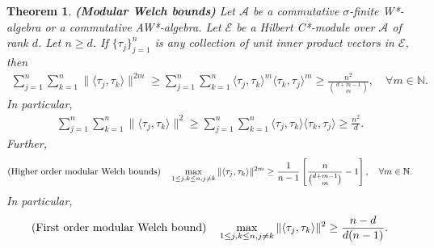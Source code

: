 \documentclass{amsart}
\newtheorem{theorem}{Theorem}[section]
\begin{document}
\begin{theorem}\cite{MAHESHKRISHNA2}
\textbf{(Modular Welch bounds)}
Let $\mathcal{A}$ be a commutative $\sigma$-finite W*-algebra or a commutative  AW*-algebra. Let $\mathcal{E}$ be  a Hilbert C*-module over $\mathcal{A}$ of rank $d$.  Let $n\geq d$. If 	$\{\tau_j\}_{j=1}^n$ is any collection of unit inner product  vectors in $\mathcal{E}$, then 
\begin{align*}
	\sum_{j=1}^n\sum_{k=1}^n\|\langle \tau_j, \tau_k\rangle \|^{2m}	\geq \sum_{j=1}^n\sum_{k=1}^n\langle \tau_j, \tau_k\rangle ^{m}\langle \tau_k, \tau_j\rangle ^{m}\geq \frac{n^2}{{d+m-1\choose m}}, \quad \forall m \in \mathbb{N}.
\end{align*}
In particular,
\begin{align*}
	\sum_{j=1}^n\sum_{k=1}^n\|\langle \tau_j, \tau_k\rangle \|^{2} \geq 	\sum_{j=1}^n\sum_{k=1}^n\langle \tau_j, \tau_k\rangle \langle \tau_k, \tau_j\rangle \geq \frac{n^2}{{d}}.
\end{align*}
Further, 
\begin{align*}
	\text{(\textbf{Higher order modular Welch bounds})}	\quad		\max _{1\leq j,k \leq n, j\neq k}\|\langle \tau_j, \tau_k\rangle \|^{2m}\geq \frac{1}{n-1}\left[\frac{n}{{d+m-1\choose m}}-1\right], \quad \forall m \in \mathbb{N}.
\end{align*}
In particular,
\begin{align*}
	\text{(\textbf{First order modular Welch bound})}\quad 	\max _{1\leq j,k \leq n, j\neq k}\|\langle \tau_j, \tau_k\rangle \|^{2}\geq\frac{n-d}{d(n-1)}.
\end{align*}	
\end{theorem}
\end{document}
